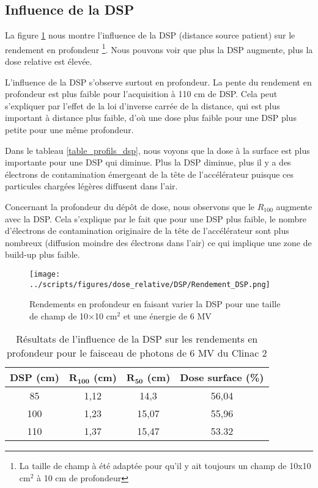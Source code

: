 \documentclass{book}
\begin{document}
\subsection{Influence de la DSP}

La figure \ref*{fig_rdt_dsp} nous montre l'influence de la DSP (distance source patient) sur le rendement en profondeur \footnote{La taille de champ à été adaptée pour qu'il y ait toujours un champ de 10x10 cm$^2$ à 10 cm de profondeur}. Nous pouvons voir que plus la DSP augmente, plus la dose relative est élevée.

L'influence de la DSP s'observe surtout en profondeur. La pente du rendement en profondeur est plus faible pour l'acquisition à 110 cm de DSP. Cela peut s'expliquer par l'effet de la loi d'inverse carrée de la distance, qui est plus important à distance plus faible, d'où une dose plus faible pour une DSP plus petite pour une même profondeur. 

Dans le tableau \ref*{table_profils_dsp}, nous voyons que la dose à la surface est plus importante pour une DSP qui diminue. Plus la DSP diminue, plus il y a des électrons de contamination émergeant de la tête de l'accélérateur puisque ces particules chargées légères diffusent dans l'air.

Concernant la profondeur du dépôt de dose, nous observons que le $R_{100}$ augmente avec la DSP. Cela s'explique par le fait que pour une DSP plus faible, le nombre d'électrons de contamination originaire de la tête de l'accélérateur sont plus nombreux (diffusion moindre des électrons dans l'air) ce qui implique une zone de build-up plus faible.

\begin{figure}[h]
  \centering
  \texttt{[image: ../scripts/figures/dose\_relative/DSP/Rendement\_DSP.png]}
  \caption{Rendements en profondeur en faisant varier la DSP pour une taille de champ de 10$\times$10 cm$^2$ et une énergie de 6 MV}
  \label{fig_rdt_dsp}
\end{figure}

\begin{table}[h]
  \centering
  \begin{tabular}{cccc}
    \toprule
    \textbf{DSP (cm)} & $\mathbf{R_{100}}$ \textbf{(cm)} & $\mathbf{R_{50}}$ \textbf{(cm)} & \textbf{Dose surface (\%)} \\
    \toprule
    85 & 1,12 & 14,3 & 56,04 \\
    100 & 1,23 & 15,07 & 55,96 \\
    110 & 1,37 & 15,47 & 53.32 \\
    \bottomrule
  \end{tabular}
  \caption{Résultats de l'influence de la DSP sur les rendements en profondeur pour le faisceau de photons de 6 MV du Clinac 2}
  \label{table_rdt_dsp}
\end{table}
\end{document}
